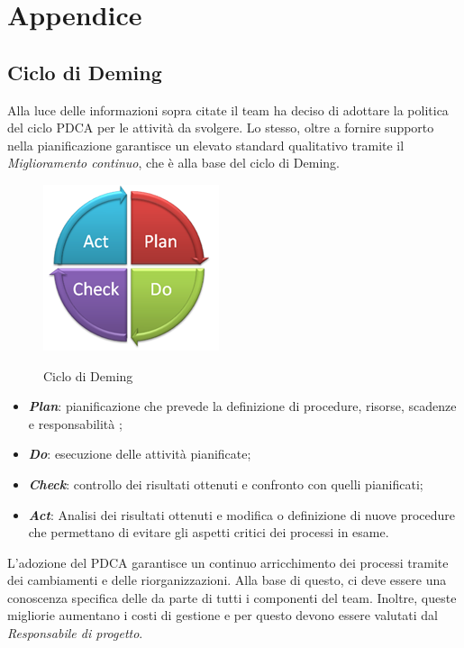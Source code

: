 \section{Appendice}
\subsection{Ciclo di Deming}
Alla luce delle informazioni sopra citate il team ha deciso di adottare la politica del ciclo PDCA per le attività da svolgere. Lo stesso, oltre a fornire supporto nella pianificazione garantisce un elevato standard qualitativo tramite il \textit{Miglioramento continuo}, che è alla base del ciclo di Deming.
\begin{figure}[H]
\centering
     \includegraphics[scale=1]{../modello/img/pdca}\\
     \caption{Ciclo di Deming}\label{fig:2}
\end{figure}
\begin{itemize}
\item \textbf{\textit{Plan}}: pianificazione che prevede la definizione di procedure, risorse, scadenze e responsabilità ;
\item \textbf{\textit{Do}}: esecuzione delle attività pianificate; 
\item \textbf{\textit{Check}}: controllo dei risultati ottenuti e confronto con quelli pianificati;
\item \textbf{\textit{Act}}: Analisi dei risultati ottenuti e modifica o definizione di nuove procedure che permettano di evitare gli aspetti critici dei processi in esame.
\end{itemize}
L'adozione del PDCA garantisce un continuo arricchimento dei processi tramite dei cambiamenti e delle riorganizzazioni. Alla base di questo, ci deve essere una conoscenza specifica delle \infoNDP{} da parte di tutti i componenti del team. Inoltre, queste migliorie aumentano i costi di gestione e per questo devono essere valutati dal \textit{Responsabile di progetto}.
